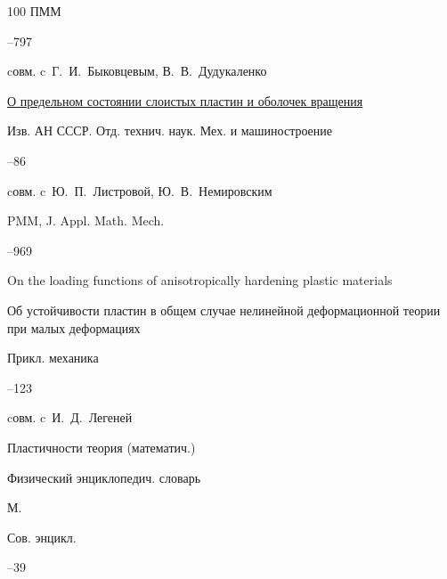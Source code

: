 \begin{thebibliography}{100}
\jour ПММ




–797 

\miscnote cовм. c~Г.~И.~Быковцевым, В.~В.~Дудукаленко






\paper \href{https://zbmath.org/?q=an:0127.15604}{О предельном состоянии слоистых пластин и оболочек вращения}

\jour Изв. АН СССР. Отд. технич. наук. Мех. и машиностроение



–86 

\miscnote cовм. c~Ю.~П.~Листровой, Ю.~В.~Немировским


\transl

\jour PMM, J. Appl. Math. Mech.



--969

\paper On the loading functions of anisotropically hardening plastic materials





\paper Об устойчивости пластин в общем случае нелинейной деформационной теории при малых деформациях 

\jour Прикл. механика



–123 

\miscnote cовм. c~И.~Д.~Легеней




\paper Пластичности теория (математич.) 

\inbook Физический энциклопедич. словарь

\publaddr М.

\publ Сов. энцикл.


–39




\end{thebibliography}
